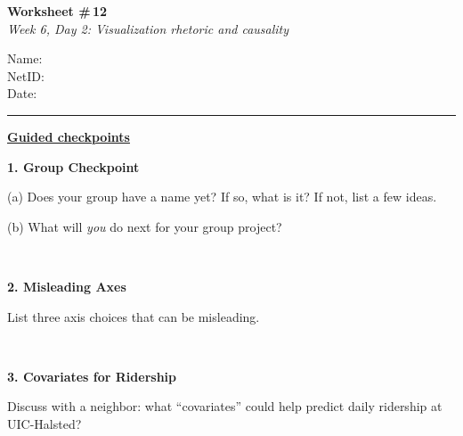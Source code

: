 \documentclass[11pt]{article}
\newcommand{\blankspace}[1]{%
  \vspace{0.3em}
  \begin{minipage}[t][#1][t]{\linewidth}
  \end{minipage}
  \vspace{0.3em}
}
\newcommand{\guidedopen}[4]{%
  \noindent\textbf{#1}\\[0.18em]
  \noindent
  \begin{minipage}[t]{0.485\textwidth}
    #2
    \blankspace{#3}
  \end{minipage}
  \hfill
  \begin{minipage}[t]{0.485\textwidth}
    \blankspace{#4}
  \end{minipage}
  \\[0.4em]
}
\begin{document}
\RaggedRight

\noindent
\begin{minipage}[t]{0.55\textwidth}
  \vspace{0pt}
  {\LARGE \textbf{Worksheet \#\,12}} \\[0.18em]
  {\large \textit{Week 6, Day 2: Visualization rhetoric and causality}}
\end{minipage}
\hfill
\begin{minipage}[t]{0.40\textwidth}
  \vspace{0pt}
  \small
  Name: \underline{\hspace{4.5cm}} \\[0.35em]
  NetID: \underline{\hspace{4.3cm}} \\[0.35em]
  Date: \underline{\hspace{4.4cm}} \\
\end{minipage}

\vspace{0.6em}
\noindent\rule{\linewidth}{0.6pt}
\vspace{0.1em}

\noindent\underline{\textbf{Guided checkpoints}}\\[0.2em]
\vspace{0.8em}

\guidedopen{1. Group Checkpoint}{
(a) Does your group have a name yet? If so, what is it? If not, list a few ideas.

\vspace{2.4cm}

(b) What will \textit{you} do next for your group project?
}{2.6cm}{7.2cm}

\vfill

\guidedopen{2. Misleading Axes}{
List three axis choices that can be misleading.
}{3.4cm}{4.3cm}

\vfill

\guidedopen{3. Covariates for Ridership}{
Discuss with a neighbor: what ``covariates'' could help predict daily ridership at UIC-Halsted?
}{3.6cm}{5.5cm}
\end{document}
